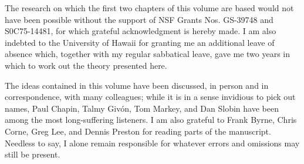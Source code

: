 
The research on which the first two chapters of this volume are based would not have been possible without the support of NSF Grants Nos. GS-39748 and S0C75-14481, for which grateful acknowledgment is hereby made. I am also indebted to the University of Hawaii for granting me an additional leave of absence which, together with my regular sabbatical leave, gave me two years in which to work out the theory presented here.

The ideas contained in this volume have been discussed, in person and in correspondence, with many colleagues; while it is in a sense in\-vidious to pick out names, Paul Chapin, Talmy Givón, Tom Markey, and Dan Slobin have been among the most long-suffering listeners. I am also grateful to Frank Byrne, Chris Corne, Greg Lee, and Dennis Pres\-ton for reading parts of the manuscript. Needless to say, I alone remain responsible for whatever errors and omissions may still be present.
